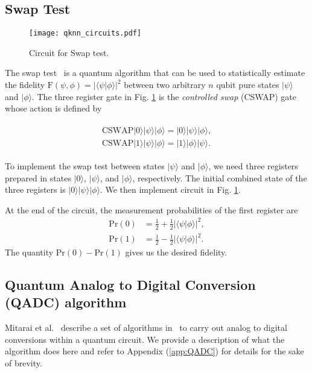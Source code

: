 \documentclass[a4paper,twocolumn,11pt,unpublished]{quantumarticle}
\newcommand{\rang}{\rangle}
\begin{document}
    \subsection{Swap Test}\label{app:SwapTest}
    
    \begin{figure}
            \begin{center}
                \texttt{[image: qknn\_circuits.pdf]}
                \caption{Circuit for Swap test.}
                \label{fig:swap}
            \end{center}
        \end{figure}
        
        
         The swap test~\cite{Buhrman2001} is a quantum algorithm that can be used to statistically estimate the fidelity $\text{F}(\psi,\phi) = |\langle\psi|\phi\rangle|^2$ between two arbitrary $n$ qubit pure states $|\psi\rangle$ and $|\phi\rangle$. The three register gate in Fig. \ref{fig:swap} is the \textit{controlled swap} (CSWAP) gate whose action is defined by
         
         \begin{align}
         \begin{split}    
             \text{CSWAP} |0\rang |\psi\rang |\phi\rang = |0\rang |\psi\rang |\phi\rang, \\ 
             \text{CSWAP} |1\rang |\psi\rang |\phi\rang = |1\rang |\phi\rang |\psi\rang.
        \end{split}     
         \end{align}
         
        To implement the swap test between states $|\psi\rang$ and $|\phi\rang$, we need three registers prepared in states $|0\rang$, $|\psi\rang$, and $|\phi\rang$, respectively. The initial combined state of the three registers is $|{0}\rang|{\psi}\rang|{\phi}\rang$. We then implement circuit in Fig. \ref{fig:swap}.
        
        
        At the end of the circuit, the measurement probabilities of the first register are
        \begin{align}
          \text{Pr}(0) & = \frac{1}{2} + \frac{1}{2}|\langle \psi|\phi\rangle|^2,\\
          \text{Pr}(1) & = \frac{1}{2} - \frac{1}{2}|\langle \psi|\phi\rangle|^2.
        \end{align}
        The quantity $\text{Pr}(0)- \text{Pr}(1)$ gives us the desired fidelity.
    \subsection{Quantum Analog to Digital Conversion (QADC) algorithm}
    Mitarai et al.~ describe a set of algorithms in~\cite{Mitarai2019} to carry out analog to digital conversions within a quantum circuit. We provide a description of what the algorithm does here and refer to Appendix (\ref{app:QADC}) for details for the sake of brevity.
    
\end{document}

